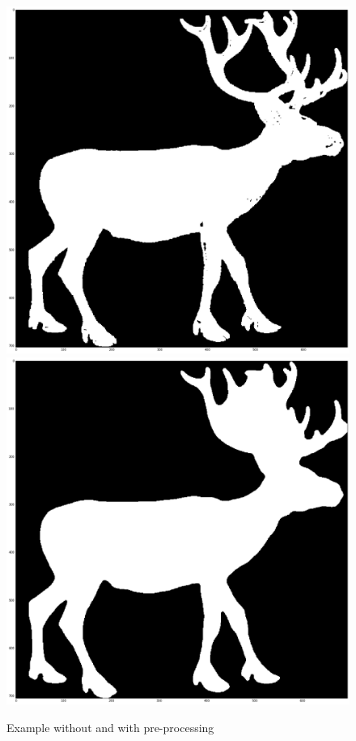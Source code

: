 \documentclass[12pt]{article}
\begin{document}
\begin{description}
        \begin{figure}[h]
          \begin{center}
            \includegraphics[scale=0.20]{deer_no_processing.png}
            \includegraphics[scale=0.20]{deer_with_processing.png}
            \caption{Example without and with pre-processing}
          \end{center}
        \end{figure}
\end{description}
\end{document}
